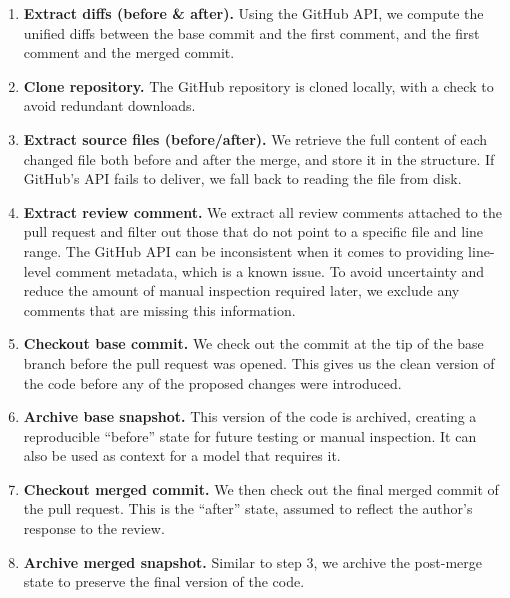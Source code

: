 \begin{enumerate}
    \item \textbf{Extract diffs (before \& after).} Using the GitHub API, we compute the unified
        diffs between the base commit and the first comment, and  the first comment and the
        merged commit.

    \item \textbf{Clone repository.} The GitHub repository is cloned locally, with a check to avoid
        redundant downloads.

    \item \textbf{Extract source files (before/after).} We retrieve the full content of each changed
        file both before and after the merge, and store it in the  structure. If
        GitHub's API fails to deliver, we fall back to reading the file from disk.

    \item \textbf{Extract review comment.} We extract all review comments attached to the pull
        request and filter out those that do not point to a specific file and line range. The GitHub
        API can be inconsistent when it comes to providing line-level comment metadata, which is a
        known issue. To avoid uncertainty and reduce the amount of manual inspection required later,
        we exclude any comments that are missing this information.

    \item \textbf{Checkout base commit.} We check out the commit at the tip of the base branch
        before the pull request was opened. This gives us the clean version of the code before any
        of the proposed changes were introduced.

    \item \textbf{Archive base snapshot.} This version of the code is archived, creating a
        reproducible “before” state for future testing or manual inspection. It can also be used as
        context for a model that requires it.

    \item \textbf{Checkout merged commit.} We then check out the final merged commit of the pull
        request. This is the “after” state, assumed to reflect the author’s response to the review.

    \item \textbf{Archive merged snapshot.} Similar to step 3, we archive the post-merge state to
        preserve the final version of the code.


\end{enumerate}
